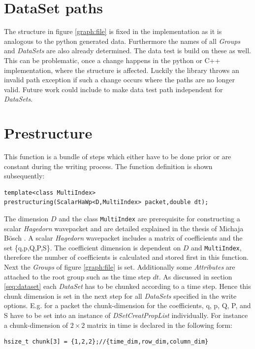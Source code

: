 \section{DataSet paths}
The structure in figure \ref{graph:file} is fixed in the implementation as it is analogous to the python generated data. Furthermore the names of all \textit{Groups} and \textit{DataSets} are also already determined. The data test is build on these as well. This can be problematic, once a change happens in the python or C++ implementation, where the structure is affected. Luckily the library throws an invalid path exception if such a change occurs where the paths are no longer valid. Future work could include to make data test path independent for \textit{DataSets}.

\section{Prestructure}
\label{seq:prestructure}
This function is a bundle of steps which either have to be done prior or are constant during the writing process. The function definition is shown subsequently:
\begin{lstlisting}
template<class MultiIndex>
prestructuring(ScalarHaWp<D,MultiIndex> packet,double dt);
\end{lstlisting}
The dimension $D$ and the class \texttt{MultiIndex} are prerequisite for constructing a scalar \textit{Hagedorn} wavepacket and are detailed explained in the thesis of Michaja B\"osch \cite{bt_michajab}. A scalar \textit{Hagedorn} wavepacket includes a matrix of coefficients and the set \{q,p,Q,P,S\}. The coefficient dimension is dependent on $D$ and \texttt{MultiIndex}, therefore the number of coefficients is calculated and stored first in this function. Next the \textit{Groups} of figure \ref{graph:file} is set. Additionally some \textit{Attributes} are attached to the root group such as the time step $dt$. As discussed in section \ref{seq:dataset} each \textit{DataSet} has to be chunked according to a time step. Hence this chunk dimension is set in the next step for all \textit{DataSets} specified in the write options. E.g. for a packet the chunk-dimension for the coefficients, q, p, Q, P, and S have to be set into an instance of \textit{DSetCreatPropList} individually. 
For instance a chunk-dimension of $2 \times 2$ matrix in time is declared in the following form:
\begin{lstlisting}
hsize_t chunk[3] = {1,2,2};//{time_dim,row_dim,column_dim}
\end{lstlisting}
